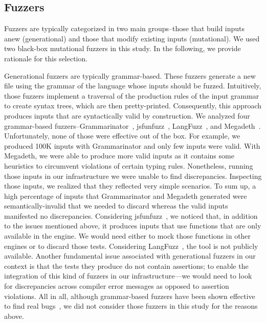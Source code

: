 \documentclass[smallextended]{svjour3}
\begin{document}
\subsection{Fuzzers}
\label{sec:objects:fuzzers}

Fuzzers are typically categorized in two main groups--those that build
inputs anew (generational) and those that modify existing inputs
(mutational). We used two black-box mutational
fuzzers
in this study. In the following, we provide rationale for this
selection.

Generational fuzzers are typically grammar-based. These fuzzers
generate a new file using the grammar of the language whose inputs
should be fuzzed. Intuitively, those fuzzers implement a traversal of
the production rules of the input grammar to create syntax trees,
which are then pretty-printed. Consequently, this approach produces
inputs that are syntactically valid by construction. We analyzed four
grammar-based fuzzers--Grammarinator~\cite{grammarinator},
jsfunfuzz~\cite{jsfunfuzz},
LangFuzz~\cite{Holler:2012:FCF:2362793.2362831}, and
Megadeth~\cite{grieco2016quickfuzz}.  Unfortunately, none of those
were effective out of the box. For example, we produced 100K inputs
with Grammarinator and only few inputs were valid. With Megadeth, we
were able to produce more valid inputs as it
contains some heuristics to circumvent violations of certain typing
rules.
Nonetheless, running those inputs in our infrastructure we were unable
to find discrepancies. Inspecting those inputs, we realized that they
reflected very simple scenarios. To sum up, a high percentage of inputs
that Grammarinator and Megadeth generated were semantically-invalid
that we needed to discard whereas the valid inputs manifested no
discrepancies. Considering jsfunfuzz~\cite{jsfunfuzz}, we noticed
that, in addition to the issues mentioned above, it produces inputs
that use functions that are only available in the \smonkey{}
engine. We would need either to mock those functions in other engines
or to discard those tests. Considering
LangFuzz~\cite{Holler:2012:FCF:2362793.2362831}, the tool is not
publicly available. Another fundamental issue associated with
generational fuzzers in our context is that the tests they produce do
not contain assertions; to enable the integration of this kind of
fuzzers in our infrastructure---we would need to look for
discrepancies across compiler error messages as opposed to assertion
violations.  All in all, although grammar-based fuzzers have been
shown effective to find real
bugs~\cite{Holler:2012:FCF:2362793.2362831}, we did not consider those
fuzzers in this study for the reasons above.
\end{document}
